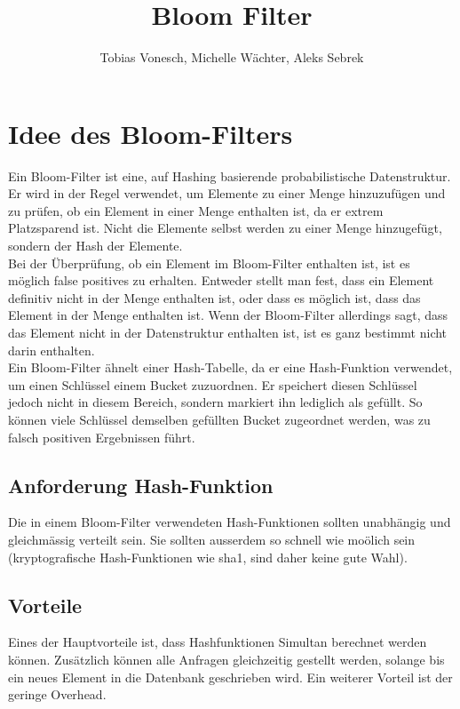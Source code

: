 \documentclass[11pt]{article}
\title{Bloom Filter}
\author{Tobias Vonesch, Michelle Wächter, Aleks Sebrek}
\begin{document}
    \maketitle

    \section{Idee des Bloom-Filters}

    Ein Bloom-Filter ist eine, auf Hashing basierende probabilistische Datenstruktur.
    Er wird in der Regel verwendet, um Elemente zu einer Menge hinzuzuf{\"u}gen und zu pr{\"u}fen, ob ein Element in einer Menge enthalten ist, da er extrem Platzsparend ist.
    Nicht die Elemente selbst werden zu einer Menge hinzugef{\"u}gt, sondern der Hash der Elemente. \\

    Bei der {\"U}berpr{\"u}fung, ob ein Element im Bloom-Filter enthalten ist, ist es m{\"o}glich false positives zu erhalten.
    Entweder stellt man fest, dass ein Element definitiv nicht in der Menge enthalten ist, oder dass es m{\"o}glich ist, dass das Element in der Menge enthalten ist.
    Wenn der Bloom-Filter allerdings sagt, dass das Element nicht in der Datenstruktur enthalten ist, ist es ganz bestimmt nicht darin enthalten.\\

    Ein Bloom-Filter {\"a}hnelt einer Hash-Tabelle, da er eine Hash-Funktion verwendet, um einen Schl{\"u}ssel einem Bucket zuzuordnen.
    Er speichert diesen Schl{\"u}ssel jedoch nicht in diesem Bereich, sondern markiert ihn lediglich als gef{\"u}llt.
    So k{\"o}nnen viele Schl{\"u}ssel demselben gef{\"u}llten Bucket zugeordnet werden, was zu falsch positiven Ergebnissen f{\"u}hrt.

    \subsection{Anforderung Hash-Funktion}
    Die in einem Bloom-Filter verwendeten Hash-Funktionen sollten unabh{\"a}ngig und gleichm{\"a}ssig verteilt sein.
    Sie sollten ausserdem so schnell wie mo{\"o}lich sein (kryptografische Hash-Funktionen wie sha1, sind daher keine gute Wahl).

    \subsection{Vorteile}
    Eines der Hauptvorteile ist, dass Hashfunktionen Simultan berechnet werden k{\"o}nnen.
    Zus{\"a}tzlich k{\"o}nnen alle Anfragen gleichzeitig gestellt werden, solange bis ein neues Element in die Datenbank geschrieben wird.
    Ein weiterer Vorteil ist der geringe Overhead.
\end{document}
